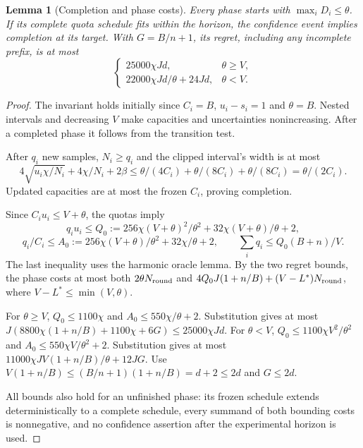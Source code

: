 \documentclass[11pt]{article}
\newtheorem{lemma}{Lemma}
\begin{document}
\begin{lemma}[Completion and phase costs]
Every phase starts with $\max_iD_i\le\theta$. If its complete quota schedule fits
within the horizon, the confidence event implies completion at its target.
With $G=B/n+1$, its regret, including any incomplete prefix, is at most
\[
 \begin{cases}
 25000\chi Jd,&\theta\ge V,\\
 22000\chi Jd/\theta+24Jd,&\theta<V.
 \end{cases}
\]
\end{lemma}
\begin{proof}
The invariant holds initially since $C_i=B$, $u_i-s_i=1$ and $\theta=B$.
Nested intervals and decreasing $V$ make capacities and uncertainties nonincreasing.
After a completed phase it follows from the transition test.

After $q_i$ new samples, $N_i\ge q_i$ and the clipped interval's width is at most
\[
 4\sqrt{u_i\chi/N_i}+4\chi/N_i+2\beta
 \le\theta/(4C_i)+\theta/(8C_i)+\theta/(8C_i)=\theta/(2C_i).
\]
Updated capacities are at most the frozen $C_i$, proving completion.

Since $C_i u_i\le V+\theta$, the quotas imply
\[
 q_i u_i\le Q_0:=256\chi(V+\theta)^2/\theta^2+32\chi(V+\theta)/\theta+2,
\]
\[
 q_i/C_i\le A_0:=256\chi(V+\theta)/\theta^2+32\chi/\theta+2,
 \qquad \sum_iq_i\le Q_0(B+n)/V.
\]
The last inequality uses the harmonic oracle lemma. By the two regret bounds,
the phase costs at most both $2\theta N_{\rm round}$ and
$4Q_0J(1+n/B)+(V-L^*)N_{\rm round}$, where $V-L^*\le\min(V,\theta)$.

For $\theta\ge V$, $Q_0\le1100\chi$ and $A_0\le550\chi/\theta+2$.
Substitution gives at most
$J(8800\chi(1+n/B)+1100\chi+6G)\le25000\chi Jd$.
For $\theta<V$, $Q_0\le1100\chi V^2/\theta^2$ and
$A_0\le550\chi V/\theta^2+2$.
Substitution gives at most
$11000\chi JV(1+n/B)/\theta+12JG$.
Use $V(1+n/B)\le(B/n+1)(1+n/B)=d+2\le2d$ and $G\le2d$.

All bounds also hold for an unfinished phase: its frozen schedule extends
deterministically to a complete schedule, every summand of both bounding costs
is nonnegative, and no confidence assertion after the experimental horizon is used.
\end{proof}
\end{document}
